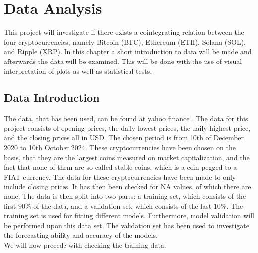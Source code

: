 \chapter{Data Analysis}\label{chap:dataanlysis}
This project will investigate if there exists a cointegrating relation between the four cryptocurrencies, namely Bitcoin (BTC), Ethereum (ETH), Solana (SOL), and Ripple (XRP). In this chapter a short introduction to data will be made and afterwards the data will be examined. This will be done with the use of visual interpretation of plots as well as statistical tests.

\section{Data Introduction}
The data, that has been used, can be found at yahoo finance \cite{Yahoo_Finance}. The data for this project consists of opening prices, the daily lowest prices, the daily highest price, and the closing prices all in USD. The chosen period is from 10th of December 2020 to 10th October 2024. These cryptocurrencies have been chosen on the basis, that they are the largest coins measured on market capitalization, and the fact that none of them are so called stable coins, which is a coin pegged to a FIAT currency. The data for these cryptocurrencies have been made to only include closing prices. It has then been checked for NA values, of which there are none. The data is then split into two parts: a training set, which consists of the first $90\%$ of the data, and a validation set, which consists of the last $10\%$. The training set is used for fitting different models. Furthermore, model validation will be performed upon this data set. The validation set has been used to investigate the forecasting ability and accuracy of the models.\\
We will now precede with checking the training data.
